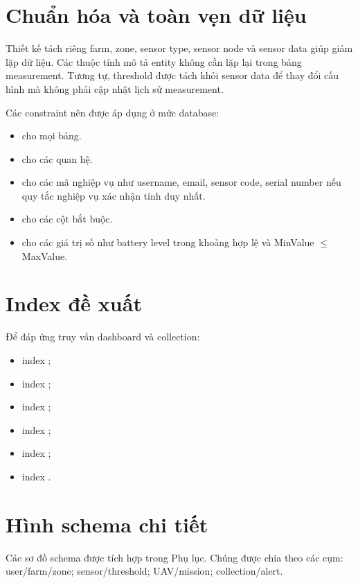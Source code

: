 \section{Chuẩn hóa và toàn vẹn dữ liệu}
Thiết kế tách riêng farm, zone, sensor type, sensor node và sensor data giúp giảm lặp dữ liệu. Các thuộc tính mô tả entity không cần lặp lại trong bảng measurement. Tương tự, threshold được tách khỏi sensor data để thay đổi cấu hình mà không phải cập nhật lịch sử measurement.

Các constraint nên được áp dụng ở mức database:
\begin{itemize}
  \item {} cho mọi bảng.
  \item {} cho các quan hệ.
  \item {} cho các mã nghiệp vụ như username, email, sensor code, serial number nếu quy tắc nghiệp vụ xác nhận tính duy nhất.
  \item {} cho các cột bắt buộc.
  \item {} cho các giá trị số như battery level trong khoảng hợp lệ và MinValue $\le$ MaxValue.
\end{itemize}

\section{Index đề xuất}
Để đáp ứng truy vấn dashboard và collection:
\begin{itemize}
  \item index ;
  \item index ;
  \item index ;
  \item index ;
  \item index ;
  \item index .
\end{itemize}

\section{Hình schema chi tiết}
Các sơ đồ schema được tích hợp trong Phụ lục. Chúng được chia theo các cụm: user/farm/zone; sensor/threshold; UAV/mission; collection/alert.
